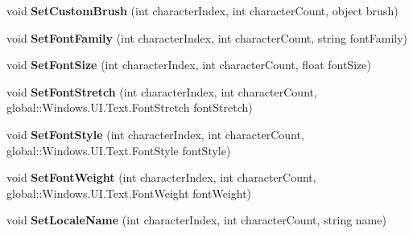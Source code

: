 \begin{DoxyCompactItemize}
void {\bfseries Set\+Custom\+Brush} (int character\+Index, int character\+Count, object brush)
\item 
\mbox{\label{interface_microsoft_1_1_graphics_1_1_canvas_1_1_text_1_1_i_canvas_text_layout_aa9cb4ef464927909fcb48d72a4703b8a}} 
void {\bfseries Set\+Font\+Family} (int character\+Index, int character\+Count, string font\+Family)
\item 
\mbox{\label{interface_microsoft_1_1_graphics_1_1_canvas_1_1_text_1_1_i_canvas_text_layout_a8b0dd44121dd43e004f96f5df2498994}} 
void {\bfseries Set\+Font\+Size} (int character\+Index, int character\+Count, float font\+Size)
\item 
\mbox{\label{interface_microsoft_1_1_graphics_1_1_canvas_1_1_text_1_1_i_canvas_text_layout_a516ffa415e1689e878df56a857176c9a}} 
void {\bfseries Set\+Font\+Stretch} (int character\+Index, int character\+Count, global\+::\+Windows.\+U\+I.\+Text.\+Font\+Stretch font\+Stretch)
\item 
\mbox{\label{interface_microsoft_1_1_graphics_1_1_canvas_1_1_text_1_1_i_canvas_text_layout_a6d809f3be58dcdf67400baee7baa91dc}} 
void {\bfseries Set\+Font\+Style} (int character\+Index, int character\+Count, global\+::\+Windows.\+U\+I.\+Text.\+Font\+Style font\+Style)
\item 
\mbox{\label{interface_microsoft_1_1_graphics_1_1_canvas_1_1_text_1_1_i_canvas_text_layout_aa79822a15fdf118523f58709bb123fc4}} 
void {\bfseries Set\+Font\+Weight} (int character\+Index, int character\+Count, global\+::\+Windows.\+U\+I.\+Text.\+Font\+Weight font\+Weight)
\item 
\mbox{\label{interface_microsoft_1_1_graphics_1_1_canvas_1_1_text_1_1_i_canvas_text_layout_a3ae7da339881c3d01eebeec801a99775}} 
void {\bfseries Set\+Locale\+Name} (int character\+Index, int character\+Count, string name)

\end{DoxyCompactItemize}
